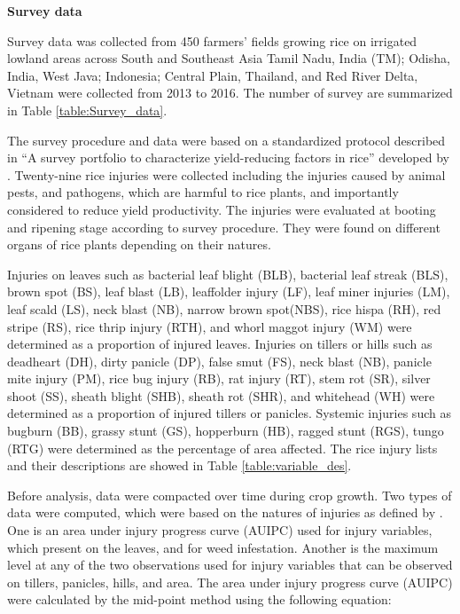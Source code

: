 \textbf{Survey data}

Survey data was collected from 450 farmers’ fields growing rice on irrigated lowland areas across South and Southeast Asia Tamil Nadu, India (TM); Odisha, India, West Java; Indonesia; Central Plain, Thailand, and Red River Delta, Vietnam were collected from 2013 to 2016. The number of survey are summarized in Table \ref{table:Survey_data}.



The survey procedure and data were based on a standardized protocol described in ``A survey portfolio to characterize yield-reducing factors in rice'' developed by \citet{Savary_2009_Survey}. Twenty-nine rice injuries were collected 
including the injuries caused by animal pests, and pathogens, which are harmful to rice plants, and importantly considered to reduce yield productivity. The injuries were evaluated at booting and ripening stage according to survey procedure. They were found on different organs of rice plants depending on their natures. 

Injuries on leaves such as bacterial leaf blight (BLB), bacterial leaf streak (BLS), brown spot (BS), leaf blast (LB), leaffolder injury (LF), leaf miner injuries (LM), leaf scald (LS), neck blast (NB), narrow brown spot(NBS), rice hispa (RH), red stripe (RS), rice thrip injury (RTH), and whorl maggot injury (WM) were determined as a proportion of injured leaves. Injuries on tillers or hills such as deadheart (DH), dirty panicle (DP), false smut (FS), neck blast (NB), panicle mite injury (PM),  rice bug injury (RB), rat injury (RT), stem rot (SR), silver shoot (SS), sheath blight (SHB), sheath rot (SHR), and whitehead (WH) were determined as a proportion of injured tillers or panicles. Systemic injuries such as bugburn (BB), grassy stunt (GS), hopperburn (HB), ragged stunt (RGS), tungo (RTG) were determined as the percentage of area affected. The rice injury lists and their descriptions are showed in Table \ref{table:variable_des}.



Before analysis, data were compacted over time during crop growth. Two types of data were computed, which were based on the natures of injuries as defined by \citet{Savary_2009_Survey}. One is an area under injury progress curve (AUIPC) used for injury variables, which present on the leaves, and for weed infestation. Another is the maximum level at any of the two observations used for injury variables that can be observed on tillers, panicles, hills, and area. The area under injury progress curve (AUIPC) \citep{Campbell_1990_Introduction} were calculated by the mid-point method using the following equation:  

